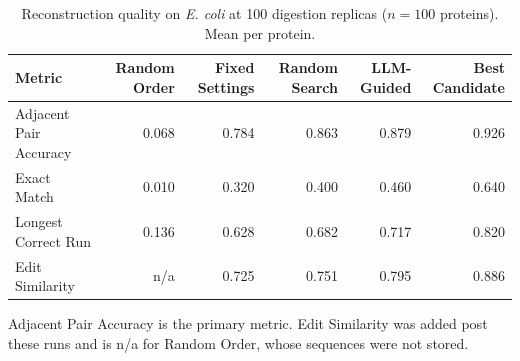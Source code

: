 \begin{table}[!tb]
  \centering
  \caption{Reconstruction quality on \textnormal{\textnormal{\textit{E. coli}}} at 100 digestion replicas ($n=100$ proteins). Mean per protein.}
  \label{tab:main_results_ecoli_r100}
  \begin{tabular}{lrrrrr}
    \toprule
    Metric & Random Order & Fixed Settings & Random Search & LLM-Guided & Best Candidate \\
    \midrule
    Adjacent Pair Accuracy & 0.068 & 0.784 & 0.863 & 0.879 & 0.926 \\
    Exact Match & 0.010 & 0.320 & 0.400 & 0.460 & 0.640 \\
    Longest Correct Run & 0.136 & 0.628 & 0.682 & 0.717 & 0.820 \\
    Edit Similarity & n/a & 0.725 & 0.751 & 0.795 & 0.886 \\
    \bottomrule
  \end{tabular}
  \par\smallskip\footnotesize{Adjacent Pair Accuracy is the primary metric. Edit Similarity was added post these runs and is n/a for Random Order, whose sequences were not stored.}
\end{table}
